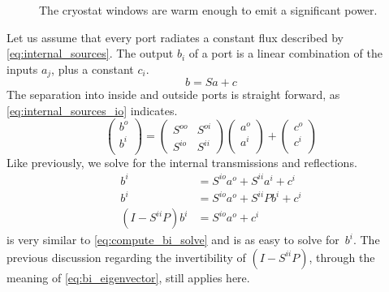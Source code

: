 \begin{figure}[hbtp]
    \centering
    \caption{\label{fig:internal_sources_windows} The cryostat windows are warm enough to emit a significant power.}
\end{figure}

Let us assume that every port radiates a constant flux described by \cref{eq:internal_sources}.
The output $b_i$ of a port is a linear combination of the inputs $a_j$, plus a constant $c_i$.
\begin{equation}
    b = S a + c
    \label{eq:internal_sources}
\end{equation}
The separation into inside and outside ports is straight forward, as \cref{eq:internal_sources_io} indicates.
\begin{equation}
    \begin{pmatrix}
        b^o\\
        b^i\\
    \end{pmatrix}
    =
    \begin{pmatrix}
        S^{oo} & S^{oi} \\
        S^{io} & S^{ii}
    \end{pmatrix}
    \begin{pmatrix}
        a^o\\
        a^i\\
    \end{pmatrix}
    +
    \begin{pmatrix}
        c^o\\
        c^i\\
    \end{pmatrix}
    \label{eq:internal_sources_io}
\end{equation}
Like previously, we solve for the internal transmissions and reflections.
\begin{subequations}
    \begin{align}
        b^i &= S^{io} a^o + S^{ii} a^i + c^i \label{eq:compute_bi_ai_ci}\\
        b^i &= S^{io} a^o + S^{ii} Pb^i + c^i \label{eq:compute_bi_bi_ci}\\
        (I - S^{ii} P) b^i &= S^{io} a^o + c^i \label{eq:compute_bi_ci_solve}
    \end{align}
    \label{eq:compute_bi_ci}
\end{subequations}
 is very similar to \cref{eq:compute_bi_solve} and is as easy to solve for~$b^i$.
The previous discussion regarding the invertibility of $(I - S^{ii} P)$, through the meaning of \cref{eq:bi_eigenvector}, still applies here.

